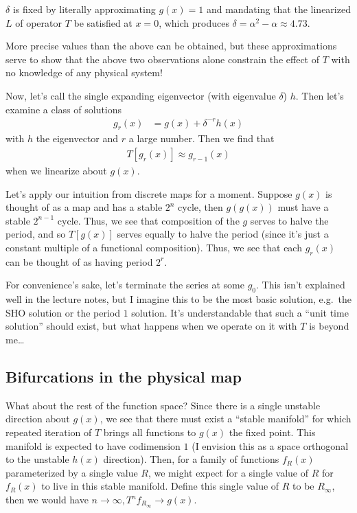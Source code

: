 \documentclass[12pt]{article}
\begin{document}
$\delta$ is fixed by literally approximating $g(x) = 1$ and mandating that the
linearized $L$ of operator $T$ be satisfied at $x=0$, which produces
$\delta = \alpha^2 - \alpha \approx 4.73$.

More precise values than the above can be obtained, but these approximations
serve to show that the above two observations alone constrain the effect of $T$
with no knowledge of any physical system!

Now, let's call the single expanding eigenvector (with eigenvalue $\delta$)
$h$. Then let's examine a class of solutions
\begin{align}
    g_r(x) &= g(x) + \delta^{-r}h(x)
\end{align}
with $h$ the eigenvector and $r$ a large number. Then we find that
\begin{align}
    T[g_r(x)] \approx g_{r-1}(x)
\end{align}
when we linearize about $g(x)$.

Let's apply our intuition from discrete maps for a moment. Suppose $g(x)$ is
thought of as a map and has a stable $2^n$ cycle, then $g(g(x))$ must have a
stable $2^{n-1}$ cycle. Thus, we see that composition of the $g$ serves to halve
the period, and so $T[g(x)]$ serves equally to halve the period (since it's just
a constant multiple of a functional composition). Thus, we see that each $g_r(x)$
can be thought of as having period $2^r$.

For convenience's sake, let's terminate the series at some $g_0$. This isn't
explained well in the lecture notes, but I imagine this to be the most basic
solution, e.g.\ the SHO solution or the period $1$ solution. It's understandable
that such a ``unit time solution'' should exist, but what happens when we
operate on it with $T$ is beyond me\dots

\subsection{Bifurcations in the physical map}

What about the rest of the function space? Since there is a single unstable
direction about $g(x)$, we see that there must exist a ``stable manifold'' for
which repeated iteration of $T$ brings all functions to $g(x)$ the fixed point.
This manifold is expected to have codimension $1$ (I envision this as a space
orthogonal to the unstable $h(x)$ direction). Then, for a family of functions
$f_R(x)$ parameterized by a single value $R$, we might expect for a single value
of $R$ for $f_R(x)$ to live in this stable manifold. Define this single value of
$R$ to be $R_\infty$, then we would have
$n \to \infty, T^n f_{R_\infty} \to g(x)$.
\end{document}
